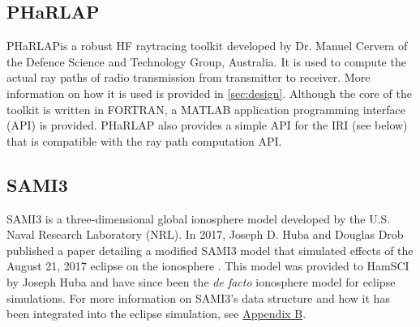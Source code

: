 \documentclass[12pt,letterpaper]{article}
\begin{document}
\subsection{PHaRLAP}
\label{sec:dependencies:pharlap}

PHaRLAP\footnotemark is a robust HF raytracing toolkit developed by Dr. Manuel
Cervera of the Defence Science and Technology Group, Australia. It is used to
compute the actual ray paths of radio transmission from transmitter to
receiver. More information on how it is used is provided in
\autoref{sec:design}. Although the core of the toolkit is written in FORTRAN, a
MATLAB application programming interface (API) is provided. PHaRLAP also
provides a simple API for the IRI (see below) that is compatible with the ray
path computation API.





\subsection{SAMI3}
\label{sec:dependencies:sami3}

SAMI3 is a three-dimensional global ionosphere model developed by the U.S. Naval
Research Laboratory (NRL). In 2017, Joseph D. Huba and Douglas Drob published a
paper detailing a modified SAMI3 model that simulated effects of the August 21,
2017 eclipse on the ionosphere \citep{Huba2017}. This model was provided to
HamSCI by Joseph Huba and have since been the {\it de facto} ionosphere model
for eclipse simulations. For more information on SAMI3's data structure and how
it has been integrated into the eclipse simulation, see
\hyperref[sec:sami3_df]{Appendix B}.
\end{document}
